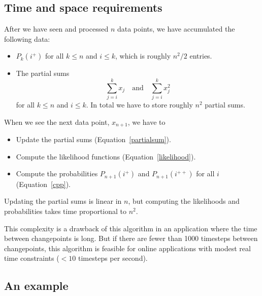 \documentclass[twocolumn,11pt]{article}
\begin{document}
\subsection{Time and space requirements}

After we have seen and processed $n$ data points, we have accumulated
the following data:

\begin{itemize}

\item $P_k(i^+)$ for all $k \le n$ and $i\le k$, which is roughly
$n^2/2$ entries.

\item The partial sums
%
\begin{equation}
\sum_{j=i}^{k} x_j \quad \mbox{and} \quad \sum_{j=i}^{k} x_j^2 
\label{partialsum}
\end{equation}
%
for all $k \le n$ and $i\le k$.  In total we have to store
roughly $n^2$ partial sums.

\end{itemize}

When we see the next data point, $x_{n+1}$, we have to 

\begin{itemize}

\item Update the partial sums (Equation~\ref{partialsum}).

\item Compute the likelihood functions (Equation~\ref{likelihood}).

\item Compute the probabilities $P_{n+1}(i^+)$ and $P_{n+1}(i^{++})$ 
for all $i$ (Equation~\ref{cpp}).

\end{itemize}

Updating the partial sums is linear in $n$, but computing the
likelihoods and probabilities takes time proportional to $n^2$.

This complexity is a drawback of this algorithm in an application
where the time between changepoints is long.  But if there are fewer
than 1000 timesteps between changepoints, this algorithm is feasible
for online applications with modest real time constraints ($<10$
timesteps per second).


\subsection{An example}
\end{document}
